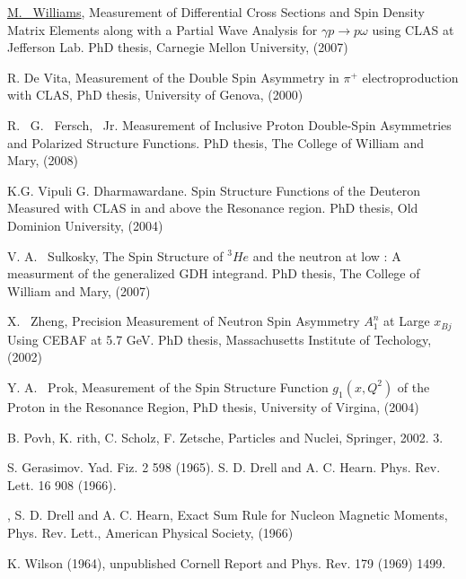  \href{http://wwwold.jlab.org/Hall-B/general/clas\_thesis.html}{M. ~Williams}, Measurement of Differential Cross Sections and Spin Density Matrix Elements along with a Partial Wave Analysis for $\gamma p \rightarrow p\omega$ using CLAS at Jefferson Lab. PhD thesis, Carnegie Mellon University, (2007)

 R. De Vita, Measurement of the Double Spin Asymmetry in $\pi^+$ electroproduction with CLAS, PhD thesis, University of Genova, (2000)

 R. ~G. ~Fersch, ~Jr. Measurement of Inclusive Proton Double-Spin Asymmetries and Polarized Structure Functions. PhD thesis, The College of William and Mary, (2008)

 K.G. Vipuli G. Dharmawardane. Spin Structure Functions of the Deuteron Measured with CLAS in and above the Resonance region. PhD thesis, Old Dominion University, (2004)

 V. A. ~Sulkosky, The Spin Structure of $^3He$ and the neutron at low \qsq: A measurment of the generalized GDH integrand. PhD thesis, The College of William and Mary, (2007)  

 X. ~Zheng, Precision Measurement of Neutron Spin Asymmetry $A_1^n$ at Large $x_{Bj}$ Using CEBAF at 5.7 GeV.        PhD thesis, Massachusetts Institute of Techology, (2002)

 Y. A. ~Prok, Measurement of the Spin Structure Function $g_1(x,Q^2)$ of the Proton in the Resonance Region,         PhD thesis, University of Virgina, (2004)



 B. Povh, K. rith, C. Scholz, F. Zetsche, Particles and Nuclei, Springer, 2002. 3.%


 S. Gerasimov. Yad. Fiz. 2 598 (1965). S. D. Drell and A. C. Hearn. Phys. Rev. Lett. 16 908 (1966).

,
        S. D. Drell and A. C. Hearn, Exact Sum Rule for Nucleon Magnetic Moments,
        Phys. Rev. Lett., American Physical Society, (1966)

 K. Wilson (1964), unpublished Cornell Report and Phys. Rev. 179 (1969) 1499. 




